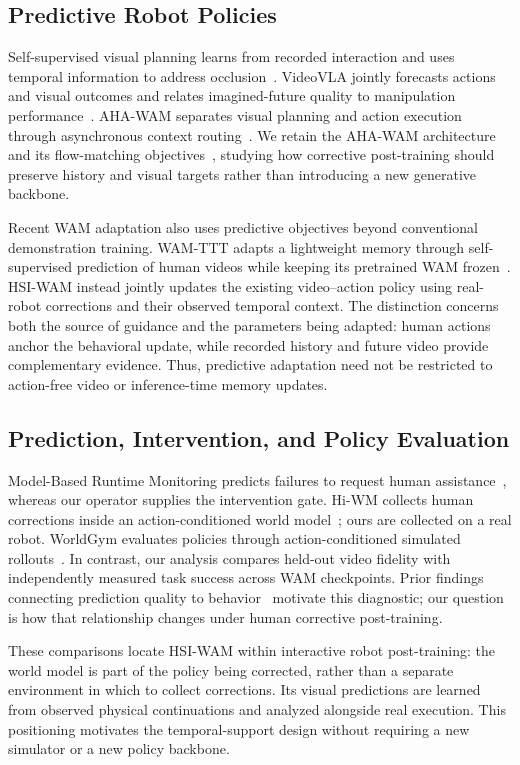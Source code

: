 \documentclass[letterpaper,10pt,conference]{ieeeconf}
\begin{document}
\subsection{Predictive Robot Policies}
Self-supervised visual planning learns from recorded interaction and uses temporal information to address occlusion~\cite{temporalplanning}. VideoVLA jointly forecasts actions and visual outcomes and relates imagined-future quality to manipulation performance~\cite{videovla}. AHA-WAM separates visual planning and action execution through asynchronous context routing~\cite{ahawam}. We retain the AHA-WAM architecture and its flow-matching objectives~\cite{flow}, studying how corrective post-training should preserve history and visual targets rather than introducing a new generative backbone.

Recent WAM adaptation also uses predictive objectives beyond conventional demonstration training. WAM-TTT adapts a lightweight memory through self-supervised prediction of human videos while keeping its pretrained WAM frozen~\cite{wamttt}. HSI-WAM instead jointly updates the existing video--action policy using real-robot corrections and their observed temporal context. The distinction concerns both the source of guidance and the parameters being adapted: human actions anchor the behavioral update, while recorded history and future video provide complementary evidence. Thus, predictive adaptation need not be restricted to action-free video or inference-time memory updates.

\subsection{Prediction, Intervention, and Policy Evaluation}
Model-Based Runtime Monitoring predicts failures to request human assistance~\cite{monitor}, whereas our operator supplies the intervention gate. Hi-WM collects human corrections inside an action-conditioned world model~\cite{hiwm}; ours are collected on a real robot. WorldGym evaluates policies through action-conditioned simulated rollouts~\cite{worldgym}. In contrast, our analysis compares held-out video fidelity with independently measured task success across WAM checkpoints. Prior findings connecting prediction quality to behavior~\cite{modelspixels,videovla} motivate this diagnostic; our question is how that relationship changes under human corrective post-training.

These comparisons locate HSI-WAM within interactive robot post-training: the world model is part of the policy being corrected, rather than a separate environment in which to collect corrections. Its visual predictions are learned from observed physical continuations and analyzed alongside real execution. This positioning motivates the temporal-support design without requiring a new simulator or a new policy backbone.
\end{document}
